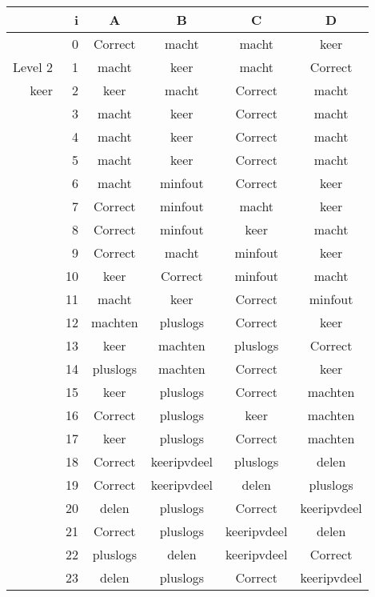 \begin{tabular}{ rr| c|c|c|c}\hline\hline
     & i & \textbf{A} & \textbf{B} & \textbf{C} & \textbf{D}\\\hline

&0&Correct\cellcolor[gray]{0.6}&macht&macht&keer\\
Level 2 & 1&macht&keer&macht&Correct\cellcolor[gray]{0.6}\\
keer &2&keer&macht&Correct\cellcolor[gray]{0.6}&macht\\
&3&macht&keer&Correct\cellcolor[gray]{0.6}&macht\\
&4&macht&keer&Correct\cellcolor[gray]{0.6}&macht\\
&5&macht&keer&Correct\cellcolor[gray]{0.6}&macht\\
&6&macht&minfout&Correct\cellcolor[gray]{0.6}&keer\\
&7&Correct\cellcolor[gray]{0.6}&minfout&macht&keer\\
&8&Correct\cellcolor[gray]{0.6}&minfout&keer&macht\\
&9&Correct\cellcolor[gray]{0.6}&macht&minfout&keer\\
&10&keer&Correct\cellcolor[gray]{0.6}&minfout&macht\\
&11&macht&keer&Correct\cellcolor[gray]{0.6}&minfout\\
&12&machten&pluslogs&Correct\cellcolor[gray]{0.6}&keer\\
&13&keer&machten&pluslogs&Correct\cellcolor[gray]{0.6}\\
&14&pluslogs&machten&Correct\cellcolor[gray]{0.6}&keer\\
&15&keer&pluslogs&Correct\cellcolor[gray]{0.6}&machten\\
&16&Correct\cellcolor[gray]{0.6}&pluslogs&keer&machten\\
&17&keer&pluslogs&Correct\cellcolor[gray]{0.6}&machten\\
&18&Correct\cellcolor[gray]{0.6}&keeripvdeel&pluslogs&delen\\
&19&Correct\cellcolor[gray]{0.6}&keeripvdeel&delen&pluslogs\\
&20&delen&pluslogs&Correct\cellcolor[gray]{0.6}&keeripvdeel\\
&21&Correct\cellcolor[gray]{0.6}&pluslogs&keeripvdeel&delen\\
&22&pluslogs&delen&keeripvdeel&Correct\cellcolor[gray]{0.6}\\
&23&delen&pluslogs&Correct\cellcolor[gray]{0.6}&keeripvdeel\\
\hline\end{tabular}\par\ \newline

